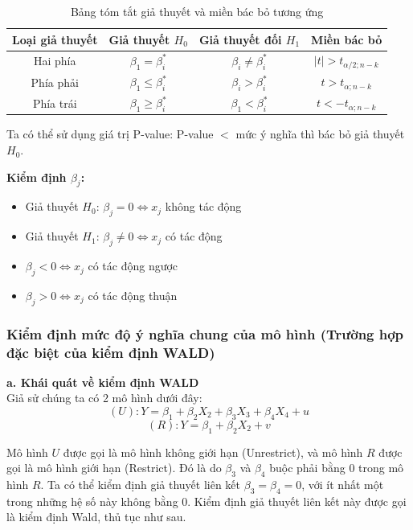 \begin{table}[h!]
\centering
\caption{Bảng tóm tắt giả thuyết và miền bác bỏ tương ứng}
\begin{tabular}{|c|c|c|c|}
\hline
\textbf{Loại giả thuyết} & \textbf{Giả thuyết $H_0$} & \textbf{Giả thuyết đối $H_1$} & \textbf{Miền bác bỏ} \\ \hline
Hai phía    & $\beta_1 = \beta_i^*$   & $\beta_i \neq \beta_i^*$   & $|t| > t_{\alpha/2;n-k}$ \\ \hline
Phía phải  & $\beta_1 \leq \beta_i^*$ & $\beta_i > \beta_i^*$     & $t > t_{\alpha;n-k}$ \\ \hline
Phía trái  & $\beta_1 \geq \beta_i^*$ & $\beta_1 < \beta_i^*$     & $t < -t_{\alpha;n-k}$ \\ \hline
\end{tabular}
\end{table}

Ta có thể sử dụng giá trị P-value: P-value $<$ mức ý nghĩa thì bác bỏ giả thuyết $H_0$.

\textbf{Kiểm định $\beta_j$:}



\begin{itemize}
\item Giả thuyết $H_0$: $\beta_j = 0 \Leftrightarrow x_j$ không tác động 
\item Giả thuyết $H_1$: $\beta_j \neq 0 \Leftrightarrow x_j$ có tác động
    \item $\beta_j < 0 \Leftrightarrow x_j$ có tác động ngược
    \item $\beta_j > 0 \Leftrightarrow x_j$ có tác động thuận
\end{itemize}
\subsubsection{Kiểm định mức độ ý nghĩa chung của mô hình (Trường hợp đặc biệt của kiểm định WALD)}
\textbf{a. Khái quát về kiểm định WALD}\\
Giả sử chúng ta có 2 mô hình dưới đây:
\[
(U): Y = \beta_1 + \beta_2 X_2 + \beta_3 X_3 + \beta_4 X_4 + u
\]
\[
(R): Y = \beta_1 + \beta_2 X_2 + v
\]

Mô hình $U$ được gọi là mô hình không giới hạn (Unrestrict), và mô hình $R$ được gọi là mô hình giới hạn (Restrict). Đó là do $\beta_3$ và $\beta_4$ buộc phải bằng 0 trong mô hình $R$. Ta có thể kiểm định giả thuyết liên kết $\beta_3 = \beta_4 = 0$, với ít nhất một trong những hệ số này không bằng 0. Kiểm định giả thuyết liên kết này được gọi là kiểm định Wald, thủ tục như sau.

